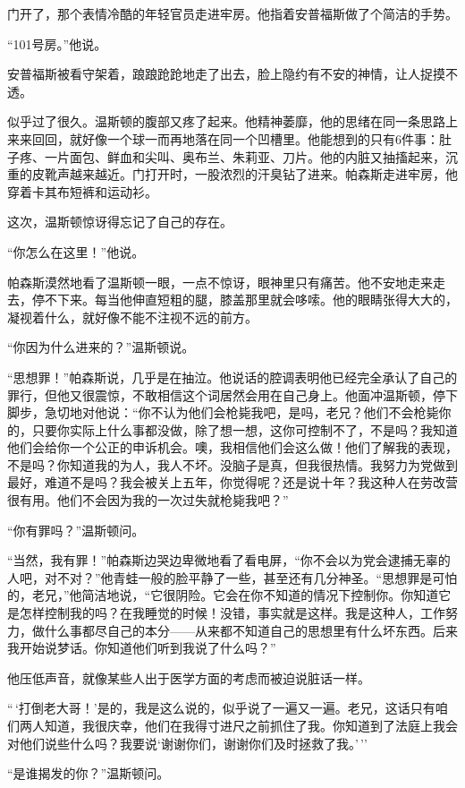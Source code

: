 门开了，那个表情冷酷的年轻官员走进牢房。他指着安普福斯做了个简洁的手势。

``101号房。''他说。

安普福斯被看守架着，踉踉跄跄地走了出去，脸上隐约有不安的神情，让人捉摸不透。

似乎过了很久。温斯顿的腹部又疼了起来。他精神萎靡，他的思绪在同一条思路上来来回回，就好像一个球一而再地落在同一个凹槽里。他能想到的只有6件事：肚子疼、一片面包、鲜血和尖叫、奥布兰、朱莉亚、刀片。他的内脏又抽搐起来，沉重的皮靴声越来越近。门打开时，一股浓烈的汗臭钻了进来。帕森斯走进牢房，他穿着卡其布短裤和运动衫。

这次，温斯顿惊讶得忘记了自己的存在。

``你怎么在这里！''他说。

帕森斯漠然地看了温斯顿一眼，一点不惊讶，眼神里只有痛苦。他不安地走来走去，停不下来。每当他伸直短粗的腿，膝盖那里就会哆嗦。他的眼睛张得大大的，凝视着什么，就好像不能不注视不远的前方。

``你因为什么进来的？''温斯顿说。

``思想罪！''帕森斯说，几乎是在抽泣。他说话的腔调表明他已经完全承认了自己的罪行，但他又很震惊，不敢相信这个词居然会用在自己身上。他面冲温斯顿，停下脚步，急切地对他说：``你不认为他们会枪毙我吧，是吗，老兄？他们不会枪毙你的，只要你实际上什么事都没做，除了想一想，这你可控制不了，不是吗？我知道他们会给你一个公正的申诉机会。噢，我相信他们会这么做！他们了解我的表现，不是吗？你知道我的为人，我人不坏。没脑子是真，但我很热情。我努力为党做到最好，难道不是吗？我会被关上五年，你觉得呢？还是说十年？我这种人在劳改营很有用。他们不会因为我的一次过失就枪毙我吧？''

``你有罪吗？''温斯顿问。

``当然，我有罪！''帕森斯边哭边卑微地看了看电屏，``你不会以为党会逮捕无辜的人吧，对不对？''他青蛙一般的脸平静了一些，甚至还有几分神圣。``思想罪是可怕的，老兄，''他简洁地说，``它很阴险。它会在你不知道的情况下控制你。你知道它是怎样控制我的吗？在我睡觉的时候！没错，事实就是这样。我是这种人，工作努力，做什么事都尽自己的本分------从来都不知道自己的思想里有什么坏东西。后来我开始说梦话。你知道他们听到我说了什么吗？''

他压低声音，就像某些人出于医学方面的考虑而被迫说脏话一样。

``\,`打倒老大哥！'是的，我是这么说的，似乎说了一遍又一遍。老兄，这话只有咱们两人知道，我很庆幸，他们在我得寸进尺之前抓住了我。你知道到了法庭上我会对他们说些什么吗？我要说`谢谢你们，谢谢你们及时拯救了我。'\,''

``是谁揭发的你？''温斯顿问。

